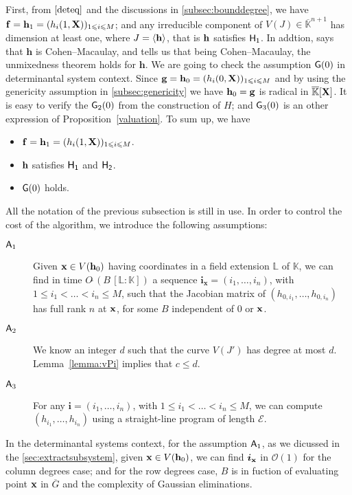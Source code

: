 \documentclass[11pt]{article}
\numberwithin{Property}{section}
\numberwithin{Theorem}{section}
\numberwithin{Proposition}{section}
\numberwithin{Lemma}{section}
\numberwithin{Corollary}{section}
\numberwithin{Definition}{section}
\numberwithin{Remark}{section}
\numberwithin{Conjecture}{section}
\numberwithin{Problem}{section}
\numberwithin{Claim}{section}
\theoremstyle{definition}
\numberwithin{Example}{section}
\def\h {\ensuremath{\mathbf{h}}}
\def\g {\ensuremath{\mathbf{g}}}
\renewcommand{\leq}{\leqslant}
\renewcommand{\le}{\leqslant}
\def\bar{\overline}
\newcommand{\bigO}[1]{\mathcal{O}(#1)} %
\renewcommand{\le}{\leqslant} %
\newcommand{\field}{\mathbb{K}} %
\newcommand{\mat}[1]{\mathbf{\MakeUppercase{#1}}} %
\newcommand{\improve}[1]{\textcolor{blue}{#1}} %
\begin{document}
First, from $\cref{deteq}$ and the discussions in \improve{\cref{subsec:bounddegree}}, we have ${\bf{f}} = {\bf{h}}_1 = (h_i(1,\mat{X}))_{1 \leq i \leq M}$; and any irreducible component of $V(J) \in \bar{\field}^{n+1}$ has dimension at least one, where $J = \langle {\bf h} \rangle$, that is $\bf{h}$ satisfies $\sf{H}_1$. In addtion, \cite[~Corollary 16.44]{Miller04} says that $\h$ is Cohen--Macaulay, and \cite[~Theorem 17.6]{Matsumura86} tells us that being Cohen--Macaulay, the unmixedness theorem holds for $\h$. We are going to check the assumption ${\sf G}(0)$ in determinantal system context. Since $\g = {\bf{h}}_0 = (h_i(0,\mat{X}))_{1 \leq i \leq M}$ and by using the genericity assumption in \improve{\ref{subsec:genericity}} we have ${\bf{h}}_0 = \g$ is radical in $\bar{\field}[\mat{X}]$. It is easy to verify the ${\sf G}_2(0)$ from the construction of $H$; and ${\sf G}_3(0)$ is an other expression of Proposition~\ref{valuation}. To sum up, we have
\begin{itemize}
\item ${\bf{f}} = {\bf{h}}_1 = (h_i(1,\mat{X}))_{1 \leq i \leq M}$. 
\item $\bf{h}$ satisfies $\sf{H}_1$ and $\sf{H}_2$.
\item ${\sf G}(0)$ holds.
\end{itemize}
All the notation of the previous subsection is still in use. In order to control the cost of the algorithm, we introduce the following assumptions:
\begin{description}
\item[${\sf A}_1$] Given ${\bf x} \in V(\h_0)$ having coordinates in a field extension $\mathbb{L}$ of $\field$, we can find in time $O\tilde{~}(B\, [\mathbb{L} : \field])$ a sequence ${\bm i}_{\mathbf{x}}= (i_1,\dots,i_n)$, with $1 \le i_1 < \dots < i_n \le M$, such that the Jacobian matrix of $(h_{0,i_1},\dots,h_{0,{i_n}})$ has full rank $n$ at ${\bf x}$, for some $B$ independent of $0$ or ${\bf x}$.
\item[${\sf A}_2$] We know an integer $d$ such that the curve $V(J')$ has degree at most $d$. Lemma~\ref{lemma:vPi} implies that  $c \le d$.
\item[${\sf A}_3$] For any ${\bm i}=(i_1,\dots,i_n)$, with $1 \le i_1 <
  \dots < i_n \le M$, we can compute $(h_{i_1},\dots,h_{{i_n}})$ using
  a straight-line program of length $\mathcal{E}$.
\end{description}

In the determinantal systems context, for the assumption ${\sf A}_1$, as we dicussed in the \improve{\cref{sec:extractsubsystem}}, given ${\bf x} \in V(\h_0)$, we can find ${\bm i}_{\bf x}$ in $\bigO{1}$ for the column degrees case; and for the row degrees case, $B$ is in fuction of evaluating point ${\bf x}$ in $\bar{G}$ and the complexity of Gaussian eliminations.  
\end{document}
